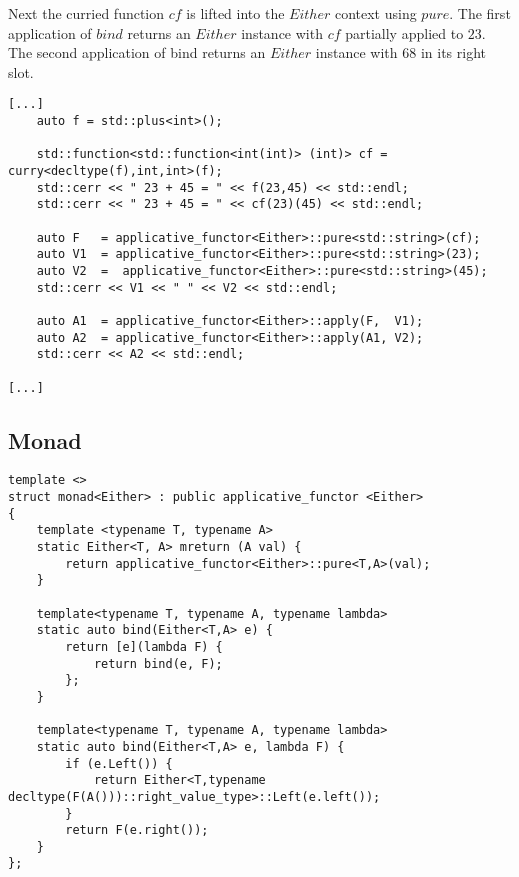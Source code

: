 \documentclass[12pt,fleqn]{article}
\begin{document}
Next the curried function $cf$ is lifted into the $Either$ context using $pure$.
The first application of $bind$ returns an $Either$ instance with $cf$ partially applied to $23$.
The second application of bind returns an $Either$ instance with $68$ in its right slot.


%
%
\begin{minipage}{\linewidth}
\begin{lstlisting}[caption=Either applicative, label=eitherappexamp]
[...]
    auto f = std::plus<int>();

	std::function<std::function<int(int)> (int)> cf = 	curry<decltype(f),int,int>(f);
	std::cerr << " 23 + 45 = " << f(23,45) << std::endl;
	std::cerr << " 23 + 45 = " << cf(23)(45) << std::endl;

	auto F   = applicative_functor<Either>::pure<std::string>(cf);
	auto V1  = applicative_functor<Either>::pure<std::string>(23);
	auto V2  =  applicative_functor<Either>::pure<std::string>(45);
	std::cerr << V1 << " " << V2 << std::endl;  
	
	auto A1  = applicative_functor<Either>::apply(F,  V1);
	auto A2  = applicative_functor<Either>::apply(A1, V2);
	std::cerr << A2 << std::endl;  

[...]
\end{lstlisting}
\end{minipage}
%
%
%


\subsection{Monad}
%
%
%



%
%
%
\begin{minipage}{\linewidth}
\begin{lstlisting}[caption=Either monad,label=eithermonad]
template <>
struct monad<Either> : public applicative_functor <Either>
{
	template <typename T, typename A> 
	static Either<T, A> mreturn (A val) {
		return applicative_functor<Either>::pure<T,A>(val);
	}
	
	template<typename T, typename A, typename lambda>
	static auto bind(Either<T,A> e) {
		return [e](lambda F) {
			return bind(e, F);
		};
	}

	template<typename T, typename A, typename lambda> 
	static auto bind(Either<T,A> e, lambda F) {
		if (e.Left()) {
			return Either<T,typename decltype(F(A()))::right_value_type>::Left(e.left());
		}
		return F(e.right());
	}
};
\end{lstlisting}
\end{minipage}
%
%
%
\end{document}
